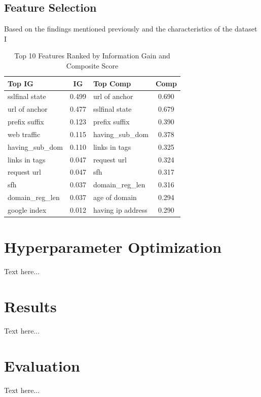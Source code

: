\documentclass{sigkddExp}
\begin{document}
\subsection{Feature Selection}
Based on the findings mentioned previously and the characteristics of the dataset I 
\begin{table}[h!]
\centering
\begin{tabular}{|p{2.5cm}|c|p{2.5cm}|c|}
\hline
\textbf{Top IG} & \textbf{IG} & \textbf{Top Comp} & \textbf{Comp} \\ \hline
sslfinal state             & 0.499  & url of anchor               & 0.690 \\ \hline
url of anchor              & 0.477  & sslfinal state              & 0.679 \\ \hline
prefix suffix              & 0.123  & prefix suffix               & 0.390 \\ \hline
web traffic                & 0.115  & having\_sub\_dom           & 0.378 \\ \hline
having\_sub\_dom          & 0.110  & links in tags               & 0.325 \\ \hline
links in tags              & 0.047 & request url                 & 0.324 \\ \hline
request url                & 0.047 & sfh                         & 0.317 \\ \hline
sfh                        & 0.037 & domain\_reg\_len  & 0.316 \\ \hline
domain\_reg\_len & 0.037 & age of domain               & 0.294 \\ \hline
google index              & 0.012  & having ip address           & 0.290 \\ \hline
\end{tabular}
\caption{Top 10 Features Ranked by Information Gain and Composite Score}
\label{table:feature_ranking}
\end{table}
 
\section{Hyperparameter Optimization}
Text here...

\section{Results}
Text here...

\section{Evaluation}
Text here...
\end{document}
